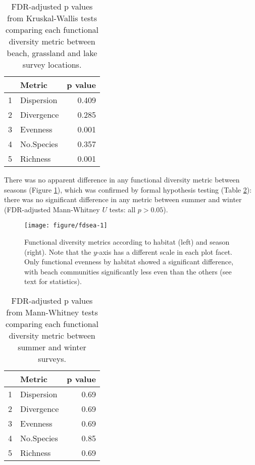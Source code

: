 \documentclass[12pt,a4paper]{article}\usepackage[]{graphicx}\usepackage[]{color}
\newenvironment{knitrout}{}{} %
\begin{document}
\begin{table}[t]
\centering
\caption{FDR-adjusted p values from Kruskal-Wallis tests comparing each functional diversity metric between beach, grassland and lake survey locations.} 
\label{fdhabt}
\begin{tabular}{rlr}
  \hline
 & Metric & p value \\ 
  \hline
1 & Dispersion & 0.409 \\ 
  2 & Divergence & 0.285 \\ 
  3 & Evenness & 0.001 \\ 
  4 & No.Species & 0.357 \\ 
  5 & Richness & 0.001 \\ 
   \hline
\end{tabular}
\end{table}


There was no apparent difference in any functional diversity metric between seasons (Figure \ref{fig:fdsea}), which was confirmed by formal hypothesis testing (Table \ref{fdseat}): there was no significant difference in any metric between summer and winter (FDR-adjusted Mann-Whitney $U$ tests: all $p > 0.05$).

\begin{knitrout}
\color{fgcolor}\begin{figure}[b]

{\centering \texttt{[image: figure/fdsea-1]} 

}

\caption[Functional diversity metrics according to habitat (left) and season (right)]{Functional diversity metrics according to habitat (left) and season (right). Note that the $y$-axis has a different scale in each plot facet. Only functional evenness by habitat showed a significant difference, with beach communities significantly less even than the others (see text for statistics).}\label{fig:fdsea}
\end{figure}


\end{knitrout}

\begin{table}[hb]
\centering
\caption{FDR-adjusted p values from Mann-Whitney tests comparing each functional diversity metric between summer and winter surveys.} 
\label{fdseat}
\begin{tabular}{rlr}
  \hline
 & Metric & p value \\ 
  \hline
1 & Dispersion & 0.69 \\ 
  2 & Divergence & 0.69 \\ 
  3 & Evenness & 0.69 \\ 
  4 & No.Species & 0.85 \\ 
  5 & Richness & 0.69 \\ 
   \hline
\end{tabular}
\end{table}
\end{document}
